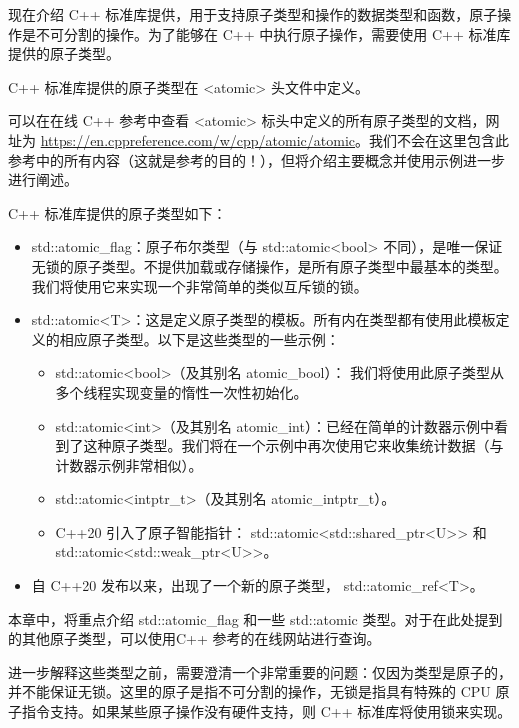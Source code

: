 

现在介绍 C++ 标准库提供，用于支持原子类型和操作的数据类型和函数，原子操作是不可分割的操作。为了能够在 C++ 中执行原子操作，需要使用 C++ 标准库提供的原子类型。


C++ 标准库提供的原子类型在 <atomic> 头文件中定义。

可以在在线 C++ 参考中查看 <atomic> 标头中定义的所有原子类型的文档，网址为 \url{https://en.cppreference.com/w/cpp/atomic/atomic}。我们不会在这里包含此参考中的所有内容（这就是参考的目的！），但将介绍主要概念并使用示例进一步进行阐述。

C++ 标准库提供的原子类型如下：

\begin{itemize}
\item
std::atomic\_flag：原子布尔类型（与 std::atomic<bool> 不同），是唯一保证无锁的原子类型。不提供加载或存储操作，是所有原子类型中最基本的类型。我们将使用它来实现一个非常简单的类似互斥锁的锁。

\item
std::atomic<T>：这是定义原子类型的模板。所有内在类型都有使用此模板定义的相应原子类型。以下是这些类型的一些示例：
\begin{itemize}
\item
std::atomic<bool>（及其别名 atomic\_bool）： 我们将使用此原子类型从多个线程实现变量的惰性一次性初始化。

\item
std::atomic<int>（及其别名 atomic\_int）：已经在简单的计数器示例中看到了这种原子类型。我们将在一个示例中再次使用它来收集统计数据（与计数器示例非常相似）。

\item
std::atomic<intptr\_t>（及其别名 atomic\_intptr\_t）。

\item
C++20 引入了原子智能指针： std::atomic<std::shared\_ptr<U>{}> 和 std::atomic<std::weak\_ptr<U>{}>。
\end{itemize}

\item
自 C++20 发布以来，出现了一个新的原子类型， std::atomic\_ref<T>。
\end{itemize}

本章中，将重点介绍 std::atomic\_flag 和一些 std::atomic 类型。对于在此处提到的其他原子类型，可以使用C++ 参考的在线网站进行查询。

进一步解释这些类型之前，需要澄清一个非常重要的问题：仅因为类型是原子的，并不能保证无锁。这里的原子是指不可分割的操作，无锁是指具有特殊的 CPU 原子指令支持。如果某些原子操作没有硬件支持，则 C++ 标准库将使用锁来实现。

